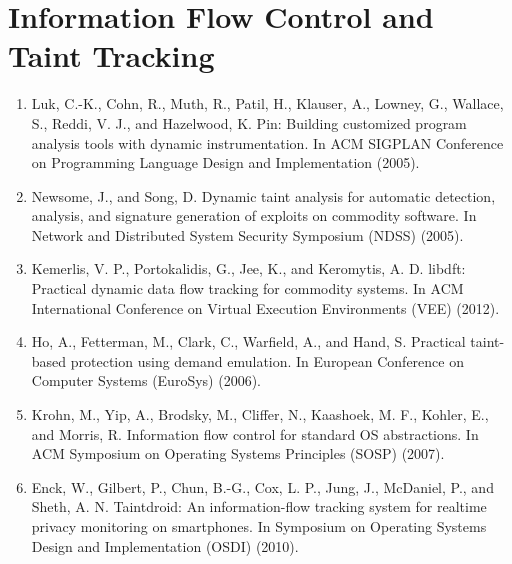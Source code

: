 \section{Information Flow Control and Taint Tracking}

\begin{enumerate}[resume]
\item Luk, C.-K., Cohn, R., Muth, R., Patil, H., Klauser, A., Lowney, G., Wallace, S., Reddi, V. J., and Hazelwood, K. Pin: Building customized program analysis tools with dynamic instrumentation. In ACM SIGPLAN Conference on Programming Language Design and Implementation (2005).
\item  Newsome, J., and Song, D. Dynamic taint analysis for automatic detection, analysis, and signature generation of exploits on commodity software. In Network and Distributed System Security Symposium (NDSS) (2005).
\item Kemerlis, V. P., Portokalidis, G., Jee, K., and Keromytis, A. D. libdft: Practical dynamic data flow tracking for commodity systems. In ACM International Conference on Virtual Execution Environments (VEE) (2012).
\item Ho, A., Fetterman, M., Clark, C., Warfield, A., and Hand, S. Practical taint-based protection using demand emulation. In European Conference on Computer Systems (EuroSys) (2006).
\item Krohn, M., Yip, A., Brodsky, M., Cliffer, N., Kaashoek, M. F., Kohler, E., and Morris, R. Information flow control for standard OS abstractions. In ACM Symposium on Operating Systems Principles (SOSP) (2007).
\item Enck, W., Gilbert, P., Chun, B.-G., Cox, L. P., Jung, J., McDaniel, P., and Sheth, A. N. Taintdroid: An information-flow tracking system for realtime privacy monitoring on smartphones. In Symposium on Operating Systems Design and Implementation (OSDI) (2010).
\end{enumerate}
